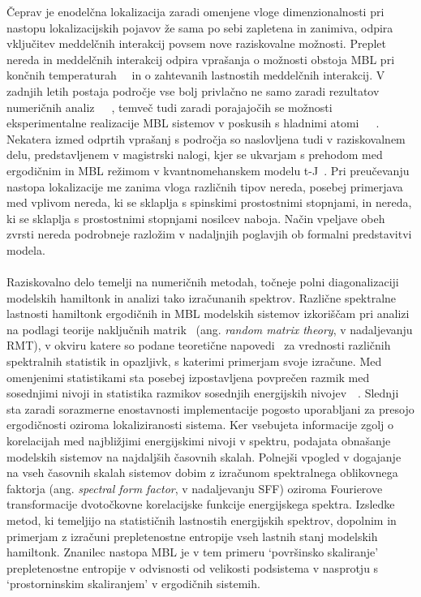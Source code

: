 \documentclass[10pt,a4paper]{article}
\begin{document}
 Čeprav je enodelčna lokalizacija zaradi omenjene  vloge dimenzionalnosti pri nastopu lokalizacijskih pojavov že sama po sebi zapletena in zanimiva, odpira vključitev meddelčnih interakcij povsem nove raziskovalne možnosti. Preplet nereda in meddelčnih interakcij odpira vprašanja o možnosti obstoja MBL pri končnih temperaturah~\cite{basko2006metal}~\cite{PhysRevB.75.155111} in o zahtevanih lastnostih meddelčnih interakcij. V zadnjih letih postaja področje vse bolj privlačno ne samo zaradi rezultatov numeričnih analiz~\cite{vznidarivc2008many}~\cite{PhysRevB.75.155111}~\cite{PhysRevA.92.041601}, temveč tudi zaradi porajajočih se možnosti eksperimentalne realizacije MBL sistemov v poskusih s hladnimi atomi~\cite{PhysRevLett.114.083002}~\cite{schreiber2015observation}~\cite{PhysRevLett.116.140401}. Nekatera izmed odprtih vprašanj s področja so naslovljena tudi v raziskovalnem delu, predstavljenem v magistrski nalogi, kjer se ukvarjam s prehodom med ergodičnim in MBL režimom v kvantnomehanskem modelu t-J~\cite{spalek2007tj}. Pri preučevanju nastopa lokalizacije me zanima vloga različnih tipov nereda, posebej primerjava med vplivom nereda, ki se sklaplja s spinskimi prostostnimi stopnjami, in nereda, ki se sklaplja s prostostnimi stopnjami nosilcev naboja. Način vpeljave obeh zvrsti nereda podrobneje razložim v nadaljnjih poglavjih ob formalni predstavitvi modela.
  \\\\Raziskovalno delo temelji na numeričnih metodah, točneje polni diagonalizaciji modelskih hamiltonk in 
  analizi tako izračunanih spektrov.  Različne spektralne lastnosti hamiltonk ergodičnih in MBL modelskih sistemov izkoriščam pri analizi na podlagi teorije naključnih matrik~\cite{d2016quantum} (ang. \emph{random matrix theory}, v nadaljevanju RMT), v okviru katere so podane teoretične napovedi~\cite{mehta2004random} za vrednosti različnih spektralnih statistik in opazljivk, s katerimi primerjam svoje izračune. Med omenjenimi statistikami sta posebej izpostavljena povprečen razmik med sosednjimi nivoji in statistika razmikov sosednjih energijskih nivojev~\cite{Atas_Distribution_PhysRevLett.110.084101}~\cite{PhysRevB.75.155111}. Slednji sta zaradi sorazmerne enostavnosti implementacije pogosto uporabljani za presojo ergodičnosti oziroma lokaliziranosti sistema. Ker vsebujeta informacije zgolj o korelacijah med najbližjimi energijskimi nivoji v spektru, podajata obnašanje modelskih sistemov na najdaljših časovnih skalah. Polnejši vpogled v dogajanje na vseh časovnih skalah sistemov dobim z izračunom spektralnega oblikovnega faktorja (ang. \emph{spectral form factor}, v nadaljevanju SFF) oziroma Fourierove transformacije dvotočkovne korelacijske funkcije energijskega spektra. Izsledke metod, ki temeljijo na statističnih lastnostih energijskih spektrov, dopolnim in primerjam z izračuni prepletenostne entropije vseh lastnih stanj modelskih hamiltonk. Znanilec nastopa MBL je v tem primeru `površinsko skaliranje' prepletenostne entropije v odvisnosti od velikosti podsistema v nasprotju s `prostorninskim skaliranjem' v ergodičnih sistemih. \\\\
\end{document}
